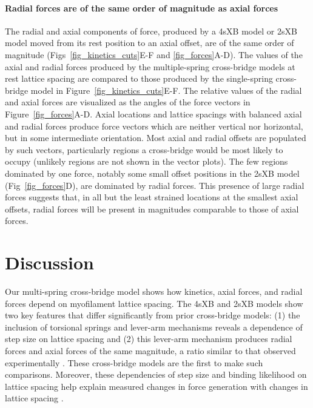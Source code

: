 \documentclass[10pt]{article}
\newcommand{\citep}[1]{\cite{#1}} %
\begin{document}
\paragraph{Radial forces are of the same order of magnitude as axial forces} %
The radial and axial components of force, produced by a 4sXB model or 2sXB model moved from its rest position to an axial offset, are of the same order of magnitude (Figs~\ref{fig_kinetics_cuts}E-F and \ref{fig_forces}A-D). 
The values of the axial and radial forces produced by the multiple-spring cross-bridge models at rest lattice spacing are compared to those produced by the single-spring cross-bridge model in Figure~\ref{fig_kinetics_cuts}E-F.
The relative values of the radial and axial forces are visualized as the angles of the force vectors in Figure~\ref{fig_forces}A-D. 
Axial locations and lattice spacings with balanced axial and radial forces produce force vectors which are neither vertical nor horizontal, but in some intermediate orientation.
Most axial and radial offsets are populated by such vectors, particularly regions a cross-bridge would be most likely to occupy (unlikely regions are not shown in the vector plots). 
The few regions dominated by one force, notably some small offset positions in the 2sXB model (Fig~\ref{fig_forces}D), are dominated by radial forces.
This presence of large radial forces suggests that, in all but the least strained locations at the smallest axial offsets, radial forces will be present in magnitudes comparable to those of axial forces. 



\section*{Discussion} %

Our multi-spring cross-bridge model shows how kinetics, axial forces, and radial forces depend on myofilament lattice spacing.
The 4sXB and 2sXB models show two key features that differ significantly from prior cross-bridge models: (1) the inclusion of torsional springs and lever-arm mechanisms reveals a dependence of step size on lattice spacing and (2) this lever-arm mechanism produces radial forces and axial forces of the same magnitude, a ratio similar to that observed experimentally \citep{Maughan1981, Cecchi1990, Brenner1991}. 
These cross-bridge models are the first to make such comparisons.
Moreover, these dependencies of step size and binding likelihood on lattice spacing help explain measured changes in force generation with changes in lattice spacing \citep{Millman1998}. 
\end{document}

